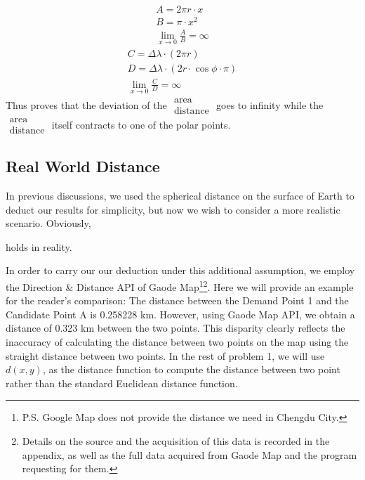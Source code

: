 \documentclass[10pt]{article}
\begin{document}
\begin{gather}
A=2\pi r\cdot x\\
B=\pi\cdot x^2\\
\lim_{x\to0}\frac{A}{B}=\infty
\end{gather}
\hline
\begin{gather}
C=\Delta\lambda\cdot(2\pi r)\\
D=\Delta\lambda\cdot(2r\cdot\cos\phi\cdot\pi)\\
\lim_{x\to0}\frac{C}{D}=\infty
\end{gather}
Thus proves that the deviation of the $\displaystyle{\begin{matrix}\mathrm{area}\\\mathrm{distance}\end{matrix}}$ goes to infinity while the $\displaystyle{\begin{matrix}\mathrm{area}\\\mathrm{distance}\end{matrix}}$ itself contracts to one of the polar points.

\subsection{Real World Distance}
In previous discussions, we used the spherical distance on the surface of Earth to deduct our results for simplicity, but now we wish to consider a more realistic scenario. Obviously,
\begin{center}
\noindent{}
\end{center}
holds in reality.

In order to carry our our deduction under this additional assumption, we employ the Direction \& Distance API of Gaode Map\footnote{P.S. Google Map does not provide the distance we need in Chengdu City.}\footnote{Details on the source and the acquisition of this data is recorded in the appendix, as well as the full data acquired from Gaode Map and the program requesting for them.}. Here we will provide an example for the reader's comparison: The distance between the Demand Point 1 and the Candidate Point A is 0.258228 km. However, using Gaode Map API, we obtain a distance of 0.323 km between the two points. This disparity clearly reflects the inaccuracy of calculating the distance between two points on the map using the straight distance between two points. In the rest of problem 1, we will use $d \left(x,y\right)$, as the distance function to compute the distance between two point rather than the standard Euclidean distance function.
\end{document}
